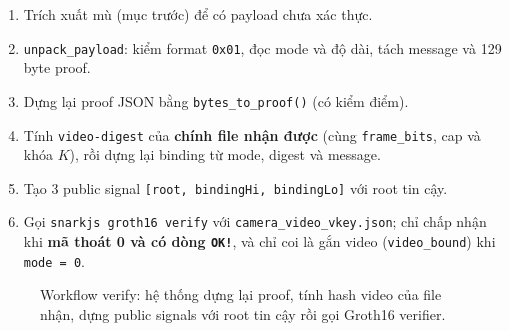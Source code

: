 \documentclass[11pt,a4paper]{article}
\begin{document}
\begin{enumerate}[leftmargin=*]
  \item Trích xuất mù (mục trước) để có payload chưa xác thực.
  \item \texttt{unpack\_payload}: kiểm format \texttt{0x01}, đọc mode và độ dài, tách
  message và 129 byte proof.
  \item Dựng lại proof JSON bằng \texttt{bytes\_to\_proof()} (có kiểm điểm).
  \item Tính \texttt{video-digest} của \textbf{chính file nhận được} (cùng
  \texttt{frame\_bits}, cap và khóa \(K\)), rồi dựng lại binding từ mode, digest và
  message.
  \item Tạo 3 public signal \texttt{[root, bindingHi, bindingLo]} với root tin cậy.
  \item Gọi \texttt{snarkjs groth16 verify} với \texttt{camera\_video\_vkey.json}; chỉ
  chấp nhận khi \textbf{mã thoát 0 và có dòng \texttt{OK!}}, và chỉ coi là gắn video
  (\texttt{video\_bound}) khi \texttt{mode = 0}.
\end{enumerate}

\begin{figure}[H]
\centering
{}
\caption{Workflow verify: hệ thống dựng lại proof, tính hash video của file nhận, dựng
public signals với root tin cậy rồi gọi Groth16 verifier.}
\label{fig:zkp-verify}
\end{figure}
\end{document}
